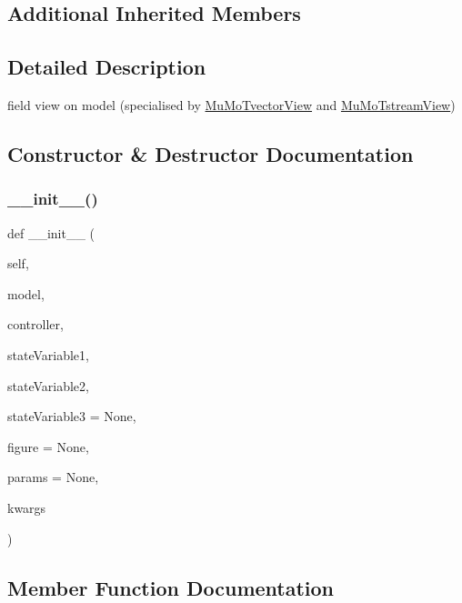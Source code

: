 \subsection*{Additional Inherited Members}


\subsection{Detailed Description}
field view on model (specialised by \hyperlink{class_mu_mo_t_1_1_mu_mo_tvector_view}{Mu\+Mo\+Tvector\+View} and \hyperlink{class_mu_mo_t_1_1_mu_mo_tstream_view}{Mu\+Mo\+Tstream\+View}) 

\subsection{Constructor \& Destructor Documentation}
\mbox{\label{class_mu_mo_t_1_1_mu_mo_tfield_view_a78d68546a28ea07c46f5f4a44ddfa49a}} 
\subsubsection{\texorpdfstring{\+\_\+\+\_\+init\+\_\+\+\_\+()}{\_\_init\_\_()}}
{\footnotesize\ttfamily def \+\_\+\+\_\+init\+\_\+\+\_\+ (\begin{DoxyParamCaption}\item[{}]{self,  }\item[{}]{model,  }\item[{}]{controller,  }\item[{}]{state\+Variable1,  }\item[{}]{state\+Variable2,  }\item[{}]{state\+Variable3 = {\ttfamily None},  }\item[{}]{figure = {\ttfamily None},  }\item[{}]{params = {\ttfamily None},  }\item[{}]{kwargs }\end{DoxyParamCaption})}



\subsection{Member Function Documentation}
\mbox{\label{class_mu_mo_t_1_1_mu_mo_tfield_view_aefbf0e354438e17ab6d48e2d368f8540}} 
